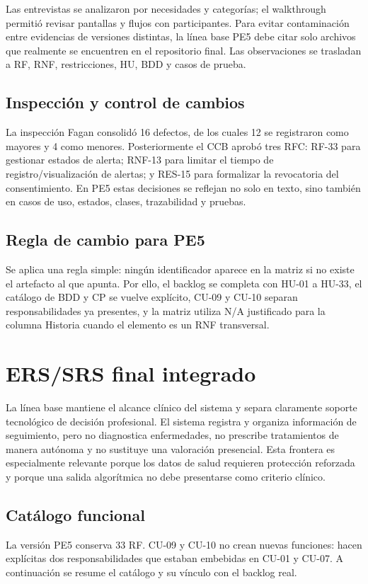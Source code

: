 \documentclass[12pt,a4paper]{article}
\begin{document}
Las entrevistas se analizaron por necesidades y categorías; el walkthrough permitió revisar pantallas y flujos con participantes. Para evitar contaminación entre evidencias de versiones distintas, la línea base PE5 debe citar solo archivos que realmente se encuentren en el repositorio final. Las observaciones se trasladan a RF, RNF, restricciones, HU, BDD y casos de prueba.

\subsection{Inspección y control de cambios}
La inspección Fagan consolidó 16 defectos, de los cuales 12 se registraron como mayores y 4 como menores. Posteriormente el CCB aprobó tres RFC: RF-33 para gestionar estados de alerta; RNF-13 para limitar el tiempo de registro/visualización de alertas; y RES-15 para formalizar la revocatoria del consentimiento. En PE5 estas decisiones se reflejan no solo en texto, sino también en casos de uso, estados, clases, trazabilidad y pruebas.

\subsection{Regla de cambio para PE5}
Se aplica una regla simple: ningún identificador aparece en la matriz si no existe el artefacto al que apunta. Por ello, el backlog se completa con HU-01 a HU-33, el catálogo de BDD y CP se vuelve explícito, CU-09 y CU-10 separan responsabilidades ya presentes, y la matriz utiliza N/A justificado para la columna Historia cuando el elemento es un RNF transversal.

\section{ERS/SRS final integrado}
La línea base mantiene el alcance clínico del sistema y separa claramente soporte tecnológico de decisión profesional. El sistema registra y organiza información de seguimiento, pero no diagnostica enfermedades, no prescribe tratamientos de manera autónoma y no sustituye una valoración presencial. Esta frontera es especialmente relevante porque los datos de salud requieren protección reforzada y porque una salida algorítmica no debe presentarse como criterio clínico.

\subsection{Catálogo funcional}
La versión PE5 conserva 33 RF. CU-09 y CU-10 no crean nuevas funciones: hacen explícitas dos responsabilidades que estaban embebidas en CU-01 y CU-07. A continuación se resume el catálogo y su vínculo con el backlog real.
\end{document}
